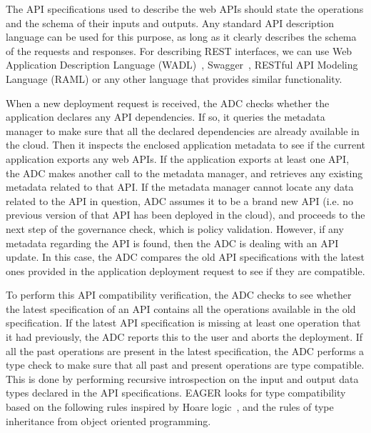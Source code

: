 The API specifications used to describe the web APIs should state the
operations and the schema of their inputs and outputs.  Any standard API
description language can be used for this purpose, as long as it clearly
describes the schema of the requests and responses. For describing REST
interfaces, we can use Web Application Description Language (WADL)~\cite{hl:wadl}, Swagger~\cite{hl:swagger},
RESTful API Modeling Language (RAML) or any other language that provides similar functionality. %

When a new deployment request is received, the ADC checks whether the
application declares any API dependencies. If so, it queries the metadata
manager to make sure that all the declared dependencies are already available
in the cloud.  Then it inspects the enclosed application metadata to see if
the current application exports any web APIs. If the application exports at
least one API, the ADC makes another call to the metadata manager, and retrieves
any existing metadata related to that API. If the metadata manager cannot
locate any data related to the API in question, ADC assumes it to be a brand
new API (i.e. no previous version of that API has been deployed in the cloud),
and proceeds to the next step of the governance check, which is policy
validation. However, if any metadata regarding the API is found, then the ADC
is dealing with an API update. In this case, the ADC compares the old API
specifications with the latest ones provided in the application deployment
request to see if they are compatible.

To perform this API compatibility verification, the ADC checks to see whether
the latest specification of an API contains all the operations available in
the old specification. If the latest API specification is missing at least one
operation that it had previously, the ADC reports this to the user and aborts
the deployment. If all the past operations are present in the latest
specification, the ADC performs a type check to make sure that all past and
present operations are type compatible. This is done by performing recursive
introspection on the input and output data types declared in the API
specifications. EAGER looks for type compatibility based on the following
rules inspired by Hoare logic~\cite{Hoare:1969:ABC:363235.363259}, and the
rules of type inheritance from object oriented programming.

